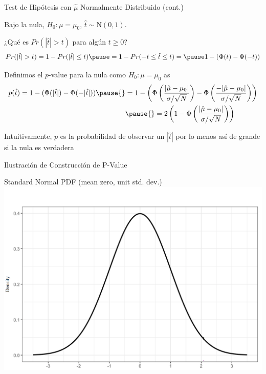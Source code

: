 \documentclass[11pt,handout,aspectratio=169]{beamer}
\newenvironment{wideitemize}{\itemize\addtolength{\itemsep}{10pt}}{\enditemize}
\begin{document}
\begin{frame}{Test de Hipótesis con $\hat\mu$ Normalmente Distribuido (cont.) }
\begin{wideitemize}
\item
Bajo la nula, $H_0:\mu=\mu_0$, $\hat{t} \sim \mathrm{N}(0,1)$.

\pause
\item ¿Qué es $Pr( |\hat{t}| > t )$ para algún $t \geq 0$? \pause
$$ Pr( |\hat{t}| > t ) = 1 - Pr(|\hat{t}| \leq t) \pause = 1 - Pr(  -t \leq \hat{t} \leq t  ) = \pause 1 - (\Phi(t) - \Phi(-t))$$ 
\vspace{-0.8cm}
\item
Definimos el $p$-value para la nula como $H_0: \mu = \mu_0$ as 
\begin{align*}
 p(\hat{t}) = 1 - (\Phi( |\hat{t} | ) - \Phi(- |\hat{t} |  )  ) \pause{} &= 1-  \left(  \Phi \left(  \frac{|\hat\mu - \mu_0|}{\sigma / \sqrt{N}} \right)  -  \Phi \left(  \frac{-|\hat\mu - \mu_0|}{\sigma / \sqrt{N}} \right) \right) 	\\
 &\pause{}= 2\left(1 -  \Phi \left(  \frac{|\hat\mu - \mu_0|}{\sigma / \sqrt{N}} \right)  \right) 
\end{align*}

 
\item
Intuitivamente, $p$ es la probabilidad de observar un $|\hat{t}|$ por lo menos así de grande si la nula es verdadera

\end{wideitemize}	
\end{frame}

\begin{frame}{Ilustración de Construcción de P-Value}
	
	
	\begin{center}
		Standard Normal PDF (mean zero, unit std. dev.)
		\includegraphics[scale=0.3]{pvalue1.png}
	\end{center}
	
\end{frame}
\end{document}
